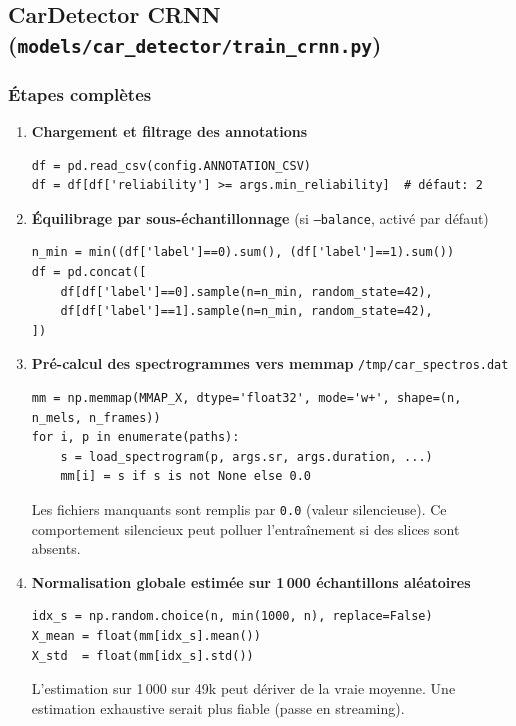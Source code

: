\documentclass[11pt,a4paper]{article}
\newcommand{\file}[1]{\texttt{\small #1}}
\newcommand{\param}[1]{\texttt{#1}}
\begin{document}
\subsection{CarDetector CRNN (\file{models/car\_detector/train\_crnn.py})}

\subsubsection{Étapes complètes}

\begin{enumerate}[leftmargin=*, label=\textbf{\arabic{*}.}]

\item \textbf{Chargement et filtrage des annotations}
\begin{lstlisting}
df = pd.read_csv(config.ANNOTATION_CSV)
df = df[df['reliability'] >= args.min_reliability]  # défaut: 2
\end{lstlisting}

\item \textbf{Équilibrage par sous-échantillonnage} (si \param{--balance}, activé par défaut)
\begin{lstlisting}
n_min = min((df['label']==0).sum(), (df['label']==1).sum())
df = pd.concat([
    df[df['label']==0].sample(n=n_min, random_state=42),
    df[df['label']==1].sample(n=n_min, random_state=42),
])
\end{lstlisting}

\item \textbf{Pré-calcul des spectrogrammes vers memmap} \file{/tmp/car\_spectros.dat}
\begin{lstlisting}
mm = np.memmap(MMAP_X, dtype='float32', mode='w+', shape=(n, n_mels, n_frames))
for i, p in enumerate(paths):
    s = load_spectrogram(p, args.sr, args.duration, ...)
    mm[i] = s if s is not None else 0.0
\end{lstlisting}
\begin{warnbox}
Les fichiers manquants sont remplis par \param{0.0} (valeur silencieuse).
Ce comportement silencieux peut polluer l'entraînement si des slices sont absents.
\end{warnbox}

\item \textbf{Normalisation globale estimée sur 1\,000 échantillons aléatoires}
\begin{lstlisting}
idx_s = np.random.choice(n, min(1000, n), replace=False)
X_mean = float(mm[idx_s].mean())
X_std  = float(mm[idx_s].std())
\end{lstlisting}
\begin{warnbox}
L'estimation sur 1\,000 sur 49k peut dériver de la vraie moyenne.
Une estimation exhaustive serait plus fiable (passe en streaming).
\end{warnbox}


\end{enumerate}
\end{document}

